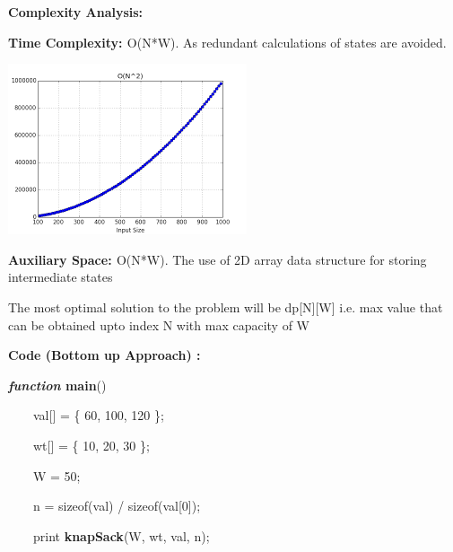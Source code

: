 \documentclass[letterpaper]{article}
\begin{document}
\bigskip
\begin{multicols}{2}
{\bfseries\color[rgb]{0.2509804,0.25882354,0.30588236}
Complexity Analysis: }

\textbf{\textcolor[rgb]{0.2509804,0.25882354,0.30588236}{Time Complexity:
}}\textcolor[rgb]{0.2509804,0.25882354,0.30588236}{O(N*W). \newline
As redundant calculations of states are avoided.}

\includegraphics[scale=1.0]{complexity}
\bigskip

\textbf{\textcolor[rgb]{0.2509804,0.25882354,0.30588236}{Auxiliary Space:
}}\textcolor[rgb]{0.2509804,0.25882354,0.30588236}{O(N*W). \newline
The use of 2D array data structure for storing intermediate states}

The most optimal solution to the problem will be dp[N][W] i.e. max value that can be obtained upto index N with max
capacity of W


\bigskip

\textbf{Code (Bottom up Approach) :} 


\bigskip

\textbf{\textit{\textcolor[rgb]{0.2509804,0.25882354,0.30588236}{function}}}\textbf{\textcolor[rgb]{0.2509804,0.25882354,0.30588236}{
main}}\textcolor[rgb]{0.2509804,0.25882354,0.30588236}{()}

{\color[rgb]{0.2509804,0.25882354,0.30588236}
\ \ \ \ val[] = \{ 60, 100, 120 \};}

{\color[rgb]{0.2509804,0.25882354,0.30588236}
\ \ \ \ wt[] = \{ 10, 20, 30 \};}

{\color[rgb]{0.2509804,0.25882354,0.30588236}
\ \ \ \ W = 50;}

{\color[rgb]{0.2509804,0.25882354,0.30588236}
\ \ \ \ n = sizeof(val) / sizeof(val[0]);}

\textcolor[rgb]{0.2509804,0.25882354,0.30588236}{\ \ \ \ print
}\textbf{\textcolor[rgb]{0.2509804,0.25882354,0.30588236}{knapSack}}\textcolor[rgb]{0.2509804,0.25882354,0.30588236}{(W,
wt, val, n);}



\end{multicols}
\end{document}
